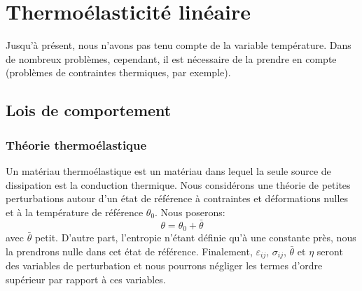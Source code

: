\chapter{Thermoélasticité linéaire}\label{chap:Ch11}
Jusqu'à présent, nous n'avons pas tenu compte de la variable température. Dans de nombreux problèmes, cependant, il est nécessaire de la prendre en compte (problèmes de contraintes thermiques, par exemple). 
\section{Lois de comportement}\label{sec:Ch11-1}
\subsection{Théorie thermoélastique}\label{ssec:Ch11-1.1}
Un matériau thermoélastique est un matériau dans lequel la seule source de dissipation est la conduction thermique.
Nous considérons une théorie de petites perturbations autour d'un état de référence à contraintes et déformations nulles et à la température de référence $\theta_0$.
Nous poserons: 
\begin{equation}
    \theta=\theta_0 + \bar{\theta}
    \label{eq:Ch11-001}
\end{equation}
avec $ \bar{\theta}$ petit.
D'autre part, l'entropie n'étant définie qu'à une constante près, nous la prendrons nulle dans cet état de référence.
Finalement, $\varepsilon_{ij}$, $\sigma_{ij}$, $\bar{\theta}$ et $\eta$ seront des variables de perturbation et nous pourrons négliger les termes d'ordre supérieur par rapport à ces variables. 

